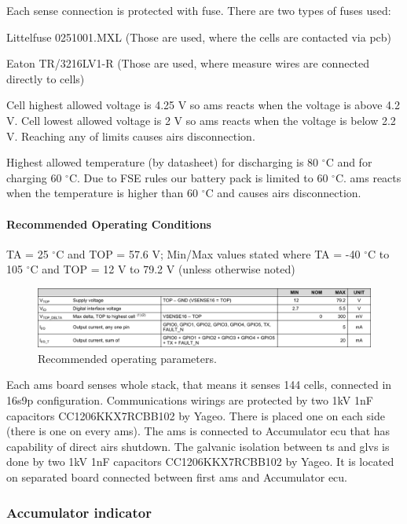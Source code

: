 Each sense connection is protected with fuse. There are two types of fuses used: 

\noindent Littelfuse 0251001.MXL (Those are used, where the cells are contacted via \gls{pcb})

\noindent Eaton TR/3216LV1-R (Those are used, where measure wires are connected directly to cells)

Cell highest allowed voltage is 4.25 V so \gls{ams} reacts when the voltage is above 4.2 V. Cell lowest allowed voltage is 2 V so \gls{ams} reacts when the voltage is below 2.2 V. Reaching any of limits causes \glspl{air} disconnection.

Highest allowed temperature (by datasheet) for discharging is 80 $^\circ$C and for charging 60 $^\circ$C. Due to FSE rules our battery pack is limited to 60 $^\circ$C. \gls{ams} reacts when the temperature is higher than 60 $^\circ$C and causes \glspl{air} disconnection.

\paragraph{Recommended Operating Conditions}
TA = 25 $^\circ$C and TOP = 57.6 V; Min/Max values stated where TA = -40 $^\circ$C to 105 $^\circ$C and TOP = 12 V to 79.2 V (unless otherwise noted)
\begin{figure}[H]
	\centering
	\includegraphics[width=\textwidth]{./img/BMS-operatingparms.pdf}
	\caption{Recommended operating parameters.}
	\label{fig:BMS-op-params}
\end{figure}


Each \gls{ams} board senses whole stack, that means it senses 144 cells, connected in 16s9p configuration. Communications wirings are protected by two 1kV 1nF capacitors CC1206KKX7RCBB102 by Yageo. There is placed one on each side (there is one on every \gls{ams}). The \gls{ams} is connected to Accumulator \gls{ecu} that has capability of direct \glspl{air} shutdown. The galvanic isolation between \gls{ts} and \gls{glvs} is done by two 1kV 1nF capacitors CC1206KKX7RCBB102 by Yageo. It is located on separated board connected between first \gls{ams} and Accumulator \gls{ecu}.




\subsubsection{Accumulator indicator}

